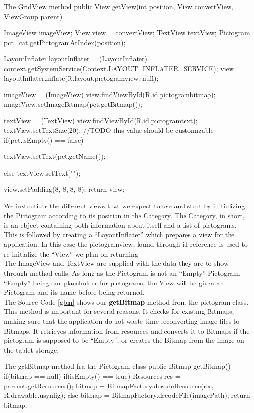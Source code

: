 \begin{source}[{gridviewm}]{The GridView method}
	public View getView(int position, View convertView, ViewGroup parent) 
	{
		ImageView imageView;
		View view = convertView;
		TextView textView;
		Pictogram pct=cat.getPictogramAtIndex(position);

		LayoutInflater layoutInflater = (LayoutInflater) context.getSystemService(Context.LAYOUT_INFLATER_SERVICE);
		view = layoutInflater.inflate(R.layout.pictogramview, null);

		imageView = (ImageView) view.findViewById(R.id.pictogrambitmap); 
		imageView.setImageBitmap(pct.getBitmap());

		textView = (TextView) view.findViewById(R.id.pictogramtext);
		textView.setTextSize(20);	//TODO this value should be customizable
		if(pct.isEmpty() == false)
		{

			textView.setText(pct.getName());
		}
		else
		{
			textView.setText("");
		}

		view.setPadding(8, 8, 8, 8);
		return view;
	}
\end{source}
We instantiate the different views that we expect to use and start by initializing the Pictogram according to its position in the Category.
The Category, in short, is an object containing both information about itself and a list of pictograms.
This is followed by creating a ``LayoutInflater'' which prepares a view for the application.
In this case the pictogramview, found through id reference is used to re-initialize the ``View'' we plan on returning.\\
The ImageView and TextView are supplied with the data they are to show through method calls. 
As long as the Pictogram is not an ``Empty'' Pictogram, ``Empty'' being our placeholder for pictograms, the View will be given an Pictogram and its name before being returned.\\

The Source Code \ref{gbm} shows our \textbf{getBitmap} method from the pictogram class.
This method is important for several reasons. It checks for existing Bitmaps, making sure that the application do not waste time reconverting image files to Bitmaps.
It retrieves information from resources and converts it to Bitmaps if the pictogram is supposed to be ``Empty'', or creates the Bitmap from the image on the tablet storage.

\begin{source}[{gbm}]{The getBitmap method fra the Pictogram class}
	public Bitmap getBitmap()
	{
		if(bitmap == null)
		{
			if(isEmpty() == true)
			{
				Resources res = parrent.getResources();
				bitmap = BitmapFactory.decodeResource(res, R.drawable.usynlig);
			}
			else
			{
				bitmap = BitmapFactory.decodeFile(imagePath);
			}
		}
		return bitmap;	
	}
\end{source}


